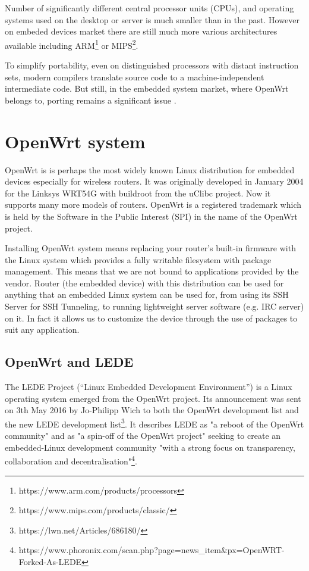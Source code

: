 Number of significantly different central processor units (CPUs), and operating systems used on the desktop or server is much smaller than in the past.
However on embeded devices market there are still much more various architectures available including ARM\footnote{https://www.arm.com/products/processors} or MIPS\footnote{https://www.mips.com/products/classic/}.

To simplify portability, even on distinguished processors with distant instruction sets, modern compilers translate source code to a machine-independent intermediate code.
But still, in the embedded system market, where OpenWrt belongs to, porting remains a significant issue \cite{porting_software}.

\section{OpenWrt system}\label{owrt}
OpenWrt is is perhaps the most widely known Linux distribution for embedded devices especially for wireless routers.
It was originally developed in January 2004 for the Linksys WRT54G with buildroot from the uClibc project.
Now it supports many more models of routers.
OpenWrt is a registered trademark which is held by the Software in the Public Interest (SPI) in the name of the OpenWrt project.

Installing OpenWrt system means replacing your router’s built-in firmware with the Linux system which provides a fully writable filesystem with package management.
This means that we are not bound to applications provided by the vendor.
Router (the embedded device) with this distribution can be used for anything that an embedded Linux system can be used for, from using its SSH Server for SSH Tunneling, to running lightweight server software (e.g. IRC server) on it.
In fact it allows us to customize the device through the use of packages to suit any application. \cite{openwrt}

\subsection{OpenWrt and LEDE}

The LEDE Project (“Linux Embedded Development Environment”) is a Linux operating system emerged from the OpenWrt project.
Its announcement was sent on 3th May 2016 by Jo-Philipp Wich to both the OpenWrt development list and the new LEDE development list\footnote{https://lwn.net/Articles/686180/}.
It describes LEDE as "a reboot of the OpenWrt community" and as "a spin-off of the OpenWrt project" seeking to create an embedded-Linux development community "with a strong focus on transparency, collaboration and decentralisation"\footnote{https://www.phoronix.com/scan.php?page=news\_item\&px=OpenWRT-Forked-As-LEDE}.

